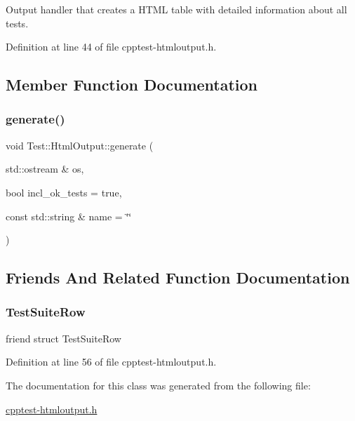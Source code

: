 Output handler that creates a H\+T\+ML table with detailed information about all tests. 

Definition at line 44 of file cpptest-\/htmloutput.\+h.



\subsection{Member Function Documentation}
\mbox{\label{class_test_1_1_html_output_a589e4e59aee4da0f70f3f6568daaf0f0}} 
\subsubsection{\texorpdfstring{generate()}{generate()}}
{\footnotesize\ttfamily void Test\+::\+Html\+Output\+::generate (\begin{DoxyParamCaption}\item[{std\+::ostream \&}]{os,  }\item[{bool}]{incl\+\_\+ok\+\_\+tests = {\ttfamily true},  }\item[{const std\+::string \&}]{name = {\ttfamily \char`\"{}\char`\"{}} }\end{DoxyParamCaption})}



\subsection{Friends And Related Function Documentation}
\mbox{\label{class_test_1_1_html_output_a1e37e043f56a53b521955598f3366682}} 
\subsubsection{\texorpdfstring{Test\+Suite\+Row}{TestSuiteRow}}
{\footnotesize\ttfamily friend struct Test\+Suite\+Row\hspace{0.3cm}{\ttfamily [friend]}}



Definition at line 56 of file cpptest-\/htmloutput.\+h.



The documentation for this class was generated from the following file\+:\begin{DoxyCompactItemize}
\item 
\mbox{\hyperlink{cpptest-htmloutput_8h}{cpptest-\/htmloutput.\+h}}\end{DoxyCompactItemize}
